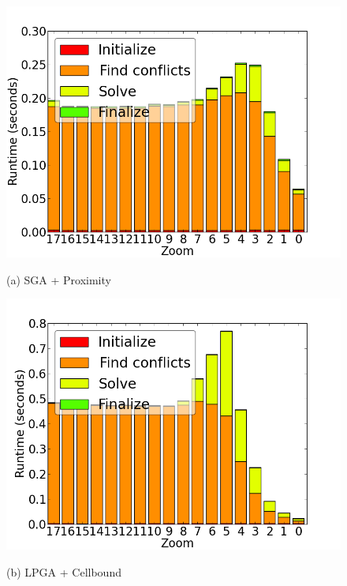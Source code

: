 \begin{figure}[tb]
  \begin{minipage}{0.329\linewidth}
    \centerline{\includegraphics[width=1.0\linewidth]{./figs/prelim_pnt_7k_airports_heuristic_B.png}}
    \centerline{(a) SGA + Proximity}
  \end{minipage} \hfill
  \begin{minipage}{0.329\linewidth}
    \centerline{\includegraphics[width=1.0\linewidth]{./figs/prelim_pnt_7k_airports_lp_A.png}}
    \centerline{(b) LPGA + Cellbound}
  \end{minipage} \hfill
  \begin{minipage}{0.329\linewidth}

\end{minipage}
\end{figure}
